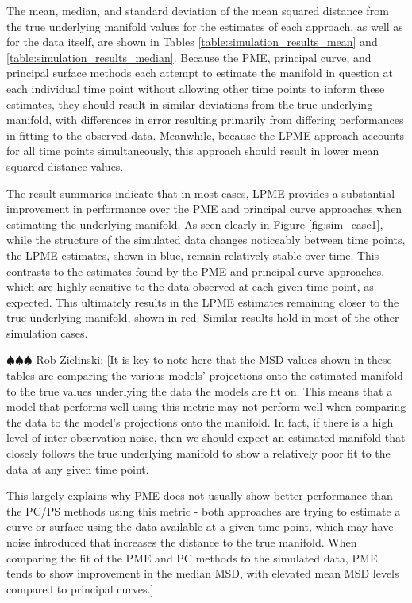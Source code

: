 \documentclass[11pt,reqno]{article}
\newcommand{\zielinski}[1]{{\color{blue} \sf $\spadesuit\spadesuit\spadesuit$ Rob Zielinski: [#1]}}
\theoremstyle{definition}
\begin{document}
The mean, median, and standard deviation of the mean squared distance from the true underlying manifold values for the estimates of each approach, as well as for the data itself, are shown in Tables \ref{table:simulation_results_mean} and \ref{table:simulation_results_median}. Because the PME, principal curve, and principal surface methods each attempt to estimate the manifold in question at each individual time point without allowing other time points to inform these estimates, they should result in similar deviations from the true underlying manifold, with differences in error resulting primarily from differing performances in fitting to the observed data. Meanwhile, because the LPME approach accounts for all time points simultaneously, this approach should result in lower mean squared distance values.

The result summaries indicate that in most cases, LPME provides a substantial improvement in performance over the PME and principal curve approaches when estimating the underlying manifold. As seen clearly in Figure \ref{fig:sim_case1}, while the structure of the simulated data changes noticeably between time points, the LPME estimates, shown in blue, remain relatively stable over time. This contrasts to the estimates found by the PME and principal curve approaches, which are highly sensitive to the data observed at each given time point, as expected. This ultimately results in the LPME estimates remaining closer to the true underlying manifold, shown in red. Similar results hold in most of the other simulation cases.

\zielinski{It is key to note here that the MSD values shown in these tables are comparing the various models' projections onto the estimated manifold to the true values underlying the data the models are fit on. This means that a model that performs well using this metric may not perform well when comparing the data to the model's projections onto the manifold. In fact, if there is a high level of inter-observation noise, then we should expect an estimated manifold that closely follows the true underlying manifold to show a relatively poor fit to the data at any given time point.

This largely explains why PME does not usually show better performance than the PC/PS methods using this metric - both approaches are trying to estimate a curve or surface using the data available at a given time point, which may have noise introduced that increases the distance to the true manifold. When comparing the fit of the PME and PC methods to the simulated data, PME tends to show improvement in the median MSD, with elevated mean MSD levels compared to principal curves.}
\end{document}
